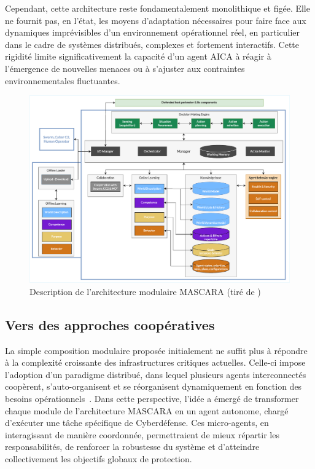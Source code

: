 Cependant, cette architecture reste fondamentalement monolithique et figée. Elle ne fournit pas, en l'état, les moyens d'adaptation nécessaires pour faire face aux dynamiques imprévisibles d'un environnement opérationnel réel, en particulier dans le cadre de systèmes distribués, complexes et fortement interactifs. Cette rigidité limite significativement la capacité d'un agent \ac{AICA} à réagir à l'émergence de nouvelles menaces ou à s'ajuster aux contraintes environnementales fluctuantes.


\begin{figure}[h!]
    \centering
    \includegraphics[width=\linewidth]{figures/MASCARA.pdf}
    \caption{Description de l'architecture modulaire \ac{MASCARA} (tiré de \autocite{Kott2023})}
    \label{fig:mascara}
\end{figure}

\subsection*{Vers des approches coopératives}

La simple composition modulaire proposée initialement ne suffit plus à répondre à la complexité croissante des infrastructures critiques actuelles. Celle-ci impose l'adoption d'un paradigme distribué, dans lequel plusieurs agents interconnectés coopèrent, s'auto-organisent et se réorganisent dynamiquement en fonction des besoins opérationnels~\cite{Ferber1999, Gleizes2008}. Dans cette perspective, l'idée a émergé de transformer chaque module de l'architecture \ac{MASCARA} en un agent autonome, chargé d'exécuter une tâche spécifique de Cyberdéfense. Ces micro-agents, en interagissant de manière coordonnée, permettraient de mieux répartir les responsabilités, de renforcer la robustesse du système et d'atteindre collectivement les objectifs globaux de protection.

